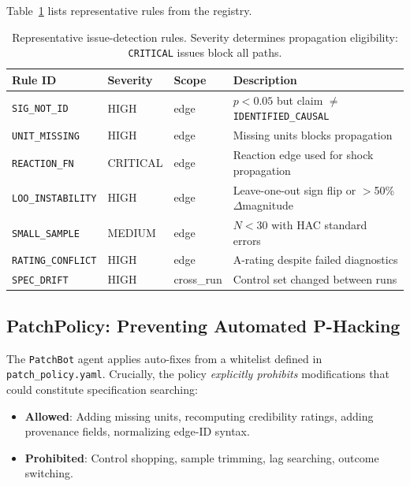 \documentclass{article}
\begin{document}
Table~\ref{tab:rules} lists representative rules from the registry.

\begin{table}[t]
\centering
\caption{Representative issue-detection rules. Severity determines propagation eligibility: \texttt{CRITICAL} issues block all paths.}
\label{tab:rules}
\small
\begin{tabular}{@{}llll@{}}
\toprule
\textbf{Rule ID} & \textbf{Severity} & \textbf{Scope} & \textbf{Description} \\
\midrule
\texttt{SIG\_NOT\_ID} & HIGH & edge & $p<0.05$ but claim $\neq$ \texttt{IDENTIFIED\_CAUSAL} \\
\texttt{UNIT\_MISSING} & HIGH & edge & Missing units blocks propagation \\
\texttt{REACTION\_FN} & CRITICAL & edge & Reaction edge used for shock propagation \\
\texttt{LOO\_INSTABILITY} & HIGH & edge & Leave-one-out sign flip or $>$50\% $\Delta$magnitude \\
\texttt{SMALL\_SAMPLE} & MEDIUM & edge & $N < 30$ with HAC standard errors \\
\texttt{RATING\_CONFLICT} & HIGH & edge & A-rating despite failed diagnostics \\
\texttt{SPEC\_DRIFT} & HIGH & cross\_run & Control set changed between runs \\
\bottomrule
\end{tabular}
\end{table}

\subsection{PatchPolicy: Preventing Automated P-Hacking}
\label{sec:patchpolicy}

The \texttt{PatchBot} agent applies auto-fixes from a whitelist defined in \texttt{patch\_policy.yaml}. Crucially, the policy \emph{explicitly prohibits} modifications that could constitute specification searching:

\begin{itemize}[leftmargin=*, itemsep=1pt]
    \item \textbf{Allowed}: Adding missing units, recomputing credibility ratings, adding provenance fields, normalizing edge-ID syntax.
    \item \textbf{Prohibited}: Control shopping, sample trimming, lag searching, outcome switching.
\end{itemize}
\end{document}

